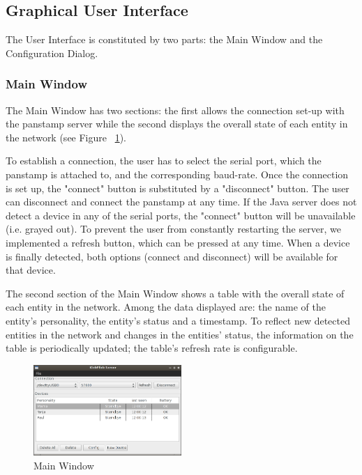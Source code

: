 \subsection{Graphical User Interface}


The User Interface is constituted by two parts: the Main Window and the Configuration Dialog.

\subsubsection{Main Window}

The Main Window has two sections: the first allows the connection set-up with the panstamp server while the second displays the overall state of each entity in the network (see Figure ~\ref{java-server-main}). 

To establish a connection, the user has to select the serial port, which the panstamp is attached to, and the corresponding baud-rate. Once the connection is set up, the "connect" button is substituted by a "disconnect" button. The user can disconnect and connect the panstamp at any time. 
If the Java server does not detect a device in any of the serial ports, the "connect" button will be unavailable (i.e. grayed out). To prevent the user from constantly restarting the server, we implemented a refresh button, which can be pressed at any time. When a device is finally detected, both options (connect and disconnect) will be available for that device.

The second section of the Main Window shows a table with the overall state of each entity in the network.
Among the data displayed are: the name of the entity's personality, the entity's status and a timestamp.
To reflect new detected entities in the network and changes in the entities' status, the information on the table is periodically updated; the table's refresh rate is configurable. 

\begin{figure}[h!]
 \centering
 \includegraphics[width= 0.5\textwidth, clip=true  ,keepaspectratio=true]{./pic/java-server-main.png}
 \caption{Main Window}
 \label{java-server-main}
\end{figure}

